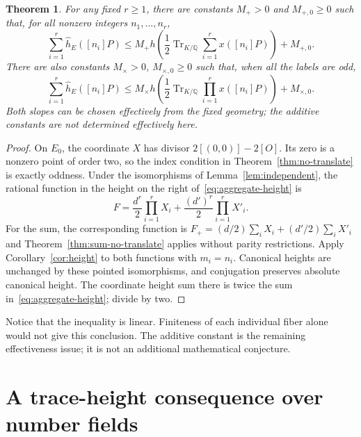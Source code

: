 \documentclass[11pt,a4paper]{article}
\newtheorem{theorem}{Theorem}
\newcommand{\Q}{\mathbb Q}\newcommand{\Z}{\mathbb Z}
\DeclareMathOperator{\Tr}{Tr}
\begin{document}
\begin{theorem}\label{thm:aggregate}
For any fixed $r\ge1$, there are constants $M_+>0$ and
$M_{+,0}\ge0$ such that, for all nonzero integers
$n_1,\ldots,n_r$,
\begin{equation}\label{eq:sum-height}
 \sum_{i=1}^r\widehat h_E([n_i]P)
 \le M_+ h\!\left(\frac12\Tr_{K/\Q}
                 \sum_{i=1}^r x([n_i]P)\right)+M_{+,0}.
\end{equation}
There are also constants $M_\times>0$, $M_{\times,0}\ge0$
such that, when all the labels are odd,
\begin{equation}\label{eq:aggregate-height}
 \sum_{i=1}^r\widehat h_E([n_i]P)
 \le M_\times h\!\left(\frac12\Tr_{K/\Q}
                 \prod_{i=1}^r x([n_i]P)\right)+M_{\times,0}.
\end{equation}
Both slopes can be chosen effectively from the fixed geometry;
the additive constants are not determined effectively here.
\end{theorem}
\begin{proof}
On $E_0$, the coordinate $X$ has divisor
$2[(0,0)]-2[O]$. Its zero is a nonzero point of order two,
so the index condition in Theorem~\ref{thm:no-translate} is
exactly oddness. Under the isomorphisms of
Lemma~\ref{lem:independent}, the rational function in the
height on the right of~\eqref{eq:aggregate-height} is
\[
 F=\frac{d^r}{2}\prod_{i=1}^r X_i
       +\frac{(d')^r}{2}\prod_{i=1}^r X'_i.
\]
For the sum, the corresponding function is
$F_+=(d/2)\sum_iX_i+(d'/2)\sum_iX'_i$ and
Theorem~\ref{thm:sum-no-translate} applies without parity
restrictions. Apply Corollary~\ref{cor:height} to both
functions with $m_i=n_i$.
Canonical heights are unchanged by these pointed
isomorphisms, and conjugation preserves absolute canonical
height. The coordinate height sum there is twice the sum
in~\eqref{eq:aggregate-height}; divide by two.
\end{proof}

Notice that the inequality is linear. Finiteness of each
individual fiber alone would not give this conclusion. The
additive constant is the remaining effectiveness issue; it is
not an additional mathematical conjecture.

\section{A trace-height consequence over number fields}
\end{document}
